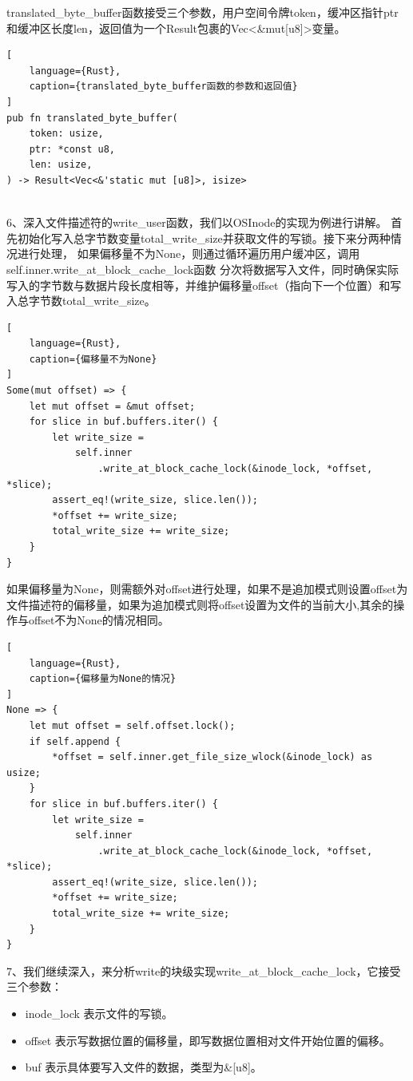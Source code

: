 translated_byte_buffer函数接受三个参数，用户空间令牌token，缓冲区指针ptr和缓冲区长度len，返回值为一个Result包裹的Vec<\&mut[u8]>变量。

\begin{lstlisting}[
    language={Rust},
    caption={translated_byte_buffer函数的参数和返回值}
]
pub fn translated_byte_buffer(
    token: usize,
    ptr: *const u8,
    len: usize,
) -> Result<Vec<&'static mut [u8]>, isize> 
    
\end{lstlisting}

6、深入文件描述符的write_user函数，我们以OSInode的实现为例进行讲解。
首先初始化写入总字节数变量total_write_size并获取文件的写锁。接下来分两种情况进行处理，
如果偏移量不为None，则通过循环遍历用户缓冲区，调用self.inner.write_at_block_cache_lock函数
分次将数据写入文件，同时确保实际写入的字节数与数据片段长度相等，并维护偏移量offset（指向下一个位置）和写入总字节数total_write_size。
\begin{lstlisting}[
    language={Rust},
    caption={偏移量不为None}
]
Some(mut offset) => {
    let mut offset = &mut offset;
    for slice in buf.buffers.iter() {
        let write_size =
            self.inner
                .write_at_block_cache_lock(&inode_lock, *offset, *slice);
        assert_eq!(write_size, slice.len());
        *offset += write_size;
        total_write_size += write_size;
    }
}
\end{lstlisting}

如果偏移量为None，则需额外对offset进行处理，如果不是追加模式则设置offset为文件描述符的偏移量，如果为追加模式则将offset设置为文件的当前大小,其余的操作与offset不为None的情况相同。
\begin{lstlisting}[
    language={Rust},
    caption={偏移量为None的情况}
]
None => {
    let mut offset = self.offset.lock();
    if self.append {
        *offset = self.inner.get_file_size_wlock(&inode_lock) as usize;
    }
    for slice in buf.buffers.iter() {
        let write_size =
            self.inner
                .write_at_block_cache_lock(&inode_lock, *offset, *slice);
        assert_eq!(write_size, slice.len());
        *offset += write_size;
        total_write_size += write_size;
    }
}
\end{lstlisting}
7、我们继续深入，来分析write的块级实现write_at_block_cache_lock，它接受三个参数：

\begin{itemize}
    \item inode_lock 表示文件的写锁。
    \item offset 表示写数据位置的偏移量，即写数据位置相对文件开始位置的偏移。
    \item buf 表示具体要写入文件的数据，类型为\&[u8]。
\end{itemize}


